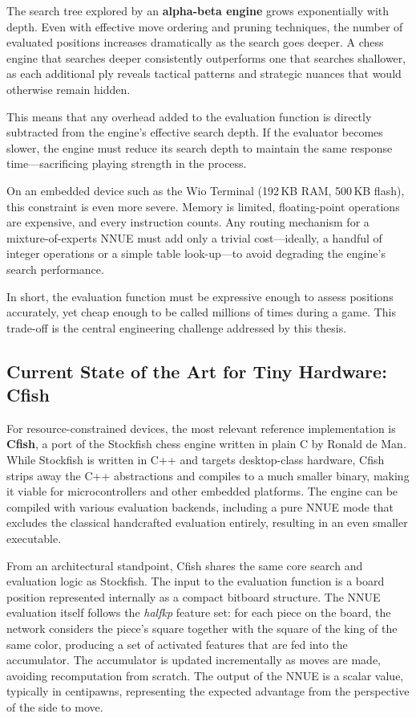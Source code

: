 The search tree explored by an \textbf{alpha-beta engine} grows exponentially with depth. Even with effective move ordering and pruning techniques, the number of evaluated positions increases dramatically as the search goes deeper. A chess engine that searches deeper consistently outperforms one that searches shallower, as each additional ply reveals tactical patterns and strategic nuances that would otherwise remain hidden.

This means that any overhead added to the evaluation function is directly subtracted from the engine's effective search depth. If the evaluator becomes slower, the engine must reduce its search depth to maintain the same response time---sacrificing playing strength in the process.

On an embedded device such as the Wio Terminal (192\,KB RAM, 500\,KB flash), this constraint is even more severe. Memory is limited, floating-point operations are expensive, and every instruction counts. Any routing mechanism for a mixture-of-experts NNUE must add only a trivial cost---ideally, a handful of integer operations or a simple table look-up---to avoid degrading the engine's search performance.

In short, the evaluation function must be expressive enough to assess positions accurately, yet cheap enough to be called millions of times during a game. This trade-off is the central engineering challenge addressed by this thesis.

\subsection{Current State of the Art for Tiny Hardware: Cfish}\label{sec:cfish-sota}

For resource-constrained devices, the most relevant reference implementation is \textbf{Cfish}, a port of the Stockfish chess engine written in plain C by Ronald de Man. While Stockfish is written in C++ and targets desktop-class hardware, Cfish strips away the C++ abstractions and compiles to a much smaller binary, making it viable for microcontrollers and other embedded platforms. The engine can be compiled with various evaluation backends, including a pure NNUE mode that excludes the classical handcrafted evaluation entirely, resulting in an even smaller executable.

From an architectural standpoint, Cfish shares the same core search and evaluation logic as Stockfish. The input to the evaluation function is a board position represented internally as a compact bitboard structure. The NNUE evaluation itself follows the \emph{halfkp} feature set: for each piece on the board, the network considers the piece's square together with the square of the king of the same color, producing a set of activated features that are fed into the accumulator. The accumulator is updated incrementally as moves are made, avoiding recomputation from scratch. The output of the NNUE is a scalar value, typically in centipawns, representing the expected advantage from the perspective of the side to move.

